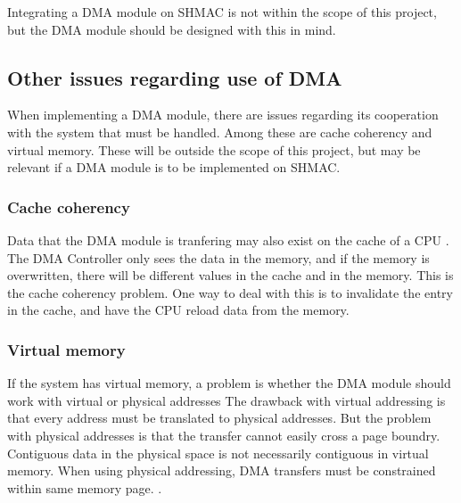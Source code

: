 Integrating a DMA module on SHMAC is not within the scope of this project, but the DMA module should be designed with this in mind.


\subsection{Other issues regarding use of DMA}

When implementing a DMA module, there are issues regarding its cooperation with the system that must be handled.
Among these are cache coherency and virtual memory.
These will be outside the scope of this project, but may be relevant if a DMA module is to be implemented on SHMAC.

\subsubsection{Cache coherency}
Data that the DMA module is tranfering may also exist on the cache of a CPU \cite{computer-construction}.
The DMA Controller only sees the data in the memory, and if the memory is overwritten, there will be different values in the cache and in the memory.
This is the cache coherency problem.
One way to deal with this is to invalidate the entry in the cache, and have the CPU reload data from the memory.

\subsubsection{Virtual memory}
If the system has virtual memory, a problem is whether the DMA module should work with virtual or physical addresses 
The drawback with virtual addressing is that every address must be translated to physical addresses.
But the problem with physical addresses is that the transfer cannot easily cross a page boundry.
Contiguous data in the physical space is not necessarily contiguous in virtual memory.
When using physical addressing, DMA transfers must be constrained within same memory page. \cite{computer-construction}.

